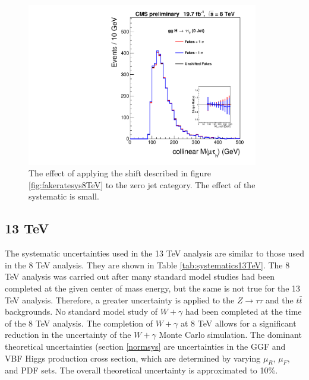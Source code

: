 \documentclass[oneside, letterpaper, oldfontcommands]{memoir}
\begin{document}
\begin{figure}[hbtp]\centering
\includegraphics[width=0.9\textwidth]{FakesUpDownShift.pdf}

\caption{The effect of applying the shift described in figure \ref{fig:fakeratesys8TeV} to the zero jet category. The effect of the systematic is small.} 
\label{fig:fakerateupdownsigma}\end{figure}

\subsection{13 TeV}
\qquad The systematic uncertainties used in the 13 TeV analysis are similar to those used in the 8 TeV analysis. They are shown in Table \ref{tab:systematics13TeV}. The 8 TeV analysis was carried out after many standard model studies had been completed \cite{1748-0221-6-11-P11002} \cite{CMS-PAS-EWK-10-002} at the given center of mass energy, but the same is not true for the 13 TeV analysis. Therefore, a greater uncertainty is applied to the $Z \rightarrow \tau\tau$ and the $t\bar{t}$ backgrounds. No standard model study of $W+\gamma$ had been completed at the time of the 8 TeV analysis. The completion of $W+\gamma$ at 8 TeV \cite{CMS-PAS-SMP-14-011} allows for a significant reduction in the uncertainty of the $W+\gamma$ Monte Carlo simulation. The dominant theoretical uncertainties (section \ref{normsys} are  uncertainties in the GGF and VBF Higgs production cross section, which are determined by varying $\mu_{R}$, $\mu_{F}$, and PDF sets. The overall theoretical uncertainty is approximated to 10\%. 
\end{document}
